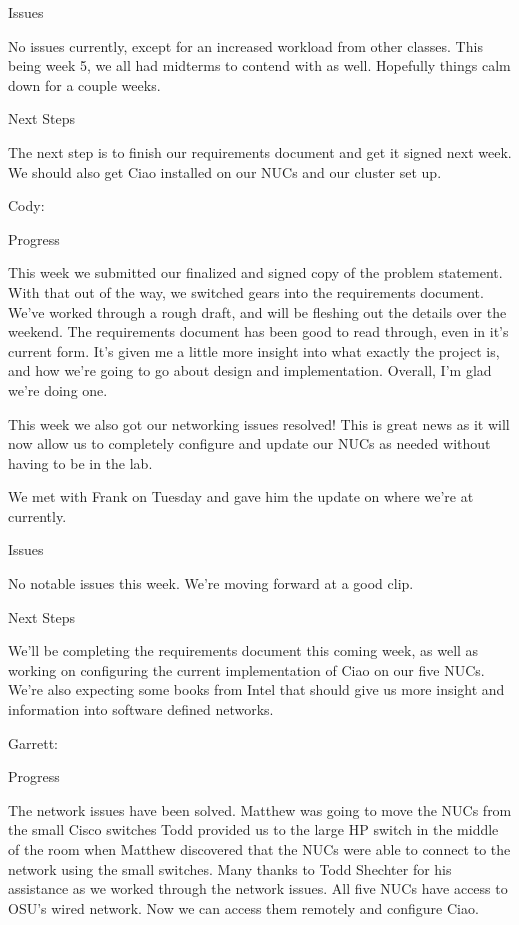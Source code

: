 \documentclass[10pt,onecolumn,journal,draftclsnofoot]{IEEEtran}
\begin{document}
Issues

No issues currently, except for an increased workload from other classes. This
being week 5, we all had midterms to contend with as well. Hopefully things calm
down for a couple weeks.

Next Steps

The next step is to finish our requirements document and get it signed next
week. We should also get Ciao installed on our NUCs and our cluster set up.

Cody:

Progress

This week we submitted our finalized and signed copy of the problem statement.
With that out of the way, we switched gears into the requirements document.
We've worked through a rough draft, and will be fleshing out the details over
the weekend. The requirements document has been good to read through, even in
it's current form. It's given me a little more insight into what exactly the
project is, and how we're going to go about design and implementation. Overall,
I'm glad we're doing one.

This week we also got our networking issues resolved! This is great news as it
will now allow us to completely configure and update our NUCs as needed without
having to be in the lab.

We met with Frank on Tuesday and gave him the update on where we're at
currently.

Issues

No notable issues this week. We're moving forward at a good clip.

Next Steps

We'll be completing the requirements document this coming week, as well as
working on configuring the current implementation of Ciao on our five NUCs.
We're also expecting some books from Intel that should give us more insight and
information into software defined networks.

Garrett:

Progress

The network issues have been solved. Matthew was going to move the NUCs from the
small Cisco switches Todd provided us to the large HP switch in the middle of
the room when Matthew discovered that the NUCs were able to connect to the
network using the small switches. Many thanks to Todd Shechter for his
assistance as we worked through the network issues. All five NUCs have access to
OSU's wired network. Now we can access them remotely and configure Ciao.
\end{document}
